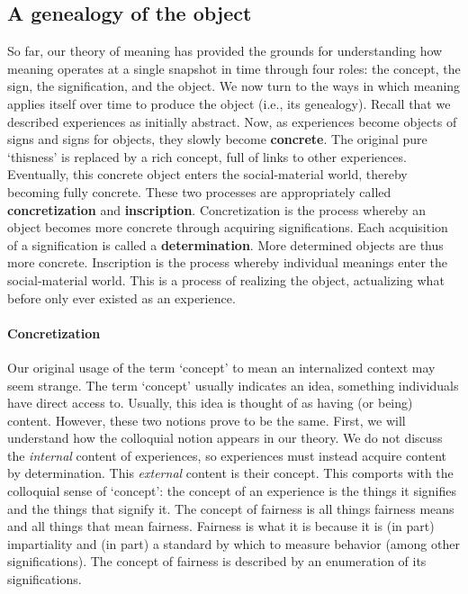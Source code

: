 \subsection{A genealogy of the object}\label{sec:theory:diachronics}
So far, our theory of meaning has provided the grounds for understanding how meaning operates at a single snapshot in time through four roles: the concept, the sign, the signification, and the object.
We now turn to the ways in which meaning applies itself over time to produce the object (i.e., its genealogy). 
Recall that we described experiences as initially abstract. 
Now, as experiences become objects of signs and signs for objects, they slowly become \textbf{concrete}. 
The original pure `thisness' is replaced by a rich concept, full of links to other experiences. 
Eventually, this concrete object enters the social-material world, thereby becoming fully concrete. 
These two processes are appropriately called \textbf{concretization} and \textbf{inscription}. 
Concretization is the process whereby an object becomes more concrete through acquiring significations. 
Each acquisition of a signification is called a \textbf{determination}.
More determined objects are thus more concrete.
Inscription is the process whereby individual meanings enter the social-material world. 
This is a process of realizing the object, actualizing what before only ever existed as an experience.

\paragraph{Concretization}
Our original usage of the term `concept' to mean an internalized context may seem strange. The term `concept' usually indicates an idea, something individuals have direct access to. Usually, this idea is thought of as having (or being) content. However, these two notions prove to be the same. First, we will understand how the colloquial notion appears in our theory. We do not discuss the \textit{internal} content of experiences, so experiences must instead acquire content by determination. This \textit{external} content is their concept. This comports with the colloquial sense of `concept': the concept of an experience is the things it signifies and the things that signify it. The concept of fairness is all things fairness means and all things that mean fairness. Fairness is what it is because it is (in part) impartiality and (in part) a standard by which to measure behavior (among other significations). The concept of fairness is described by an enumeration of its significations.

